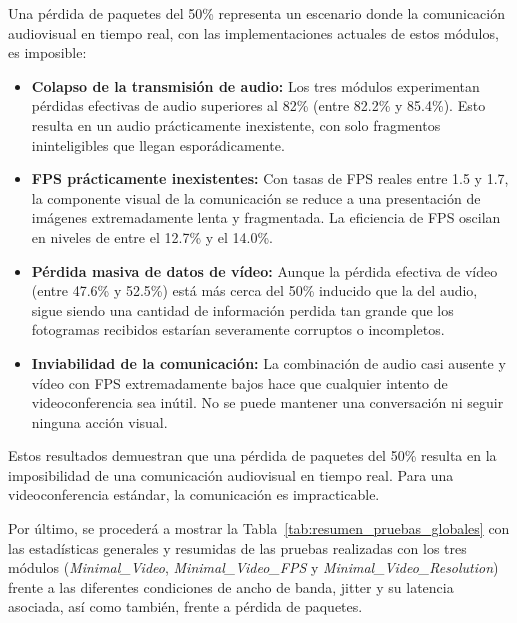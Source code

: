 Una pérdida de paquetes del 50\% representa un escenario donde la comunicación audiovisual en tiempo real, con las implementaciones actuales de estos módulos, es imposible:
\vspace{\baselineskip}

\begin{itemize}
\item \textbf{Colapso de la transmisión de audio:} Los tres módulos experimentan pérdidas efectivas de audio superiores al 82\% (entre 82.2\% y 85.4\%). Esto resulta en un audio prácticamente inexistente, con solo fragmentos ininteligibles que llegan esporádicamente.
\item \textbf{FPS prácticamente inexistentes:} Con tasas de FPS reales entre 1.5 y 1.7, la componente visual de la comunicación se reduce a una presentación de imágenes extremadamente lenta y fragmentada. La eficiencia de FPS oscilan en niveles de entre el 12.7\% y el 14.0\%.
\item \textbf{Pérdida masiva de datos de vídeo:} Aunque la pérdida efectiva de vídeo (entre 47.6\% y 52.5\%) está más cerca del 50\% inducido que la del audio, sigue siendo una cantidad de información perdida tan grande que los fotogramas recibidos estarían severamente corruptos o incompletos.
\item \textbf{Inviabilidad de la comunicación:} La combinación de audio casi ausente y vídeo con FPS extremadamente bajos hace que cualquier intento de videoconferencia sea inútil. No se puede mantener una conversación ni seguir ninguna acción visual.
\end{itemize}

Estos resultados demuestran que una pérdida de paquetes del 50\% resulta en la imposibilidad de una comunicación audiovisual en tiempo real. Para una videoconferencia estándar, la comunicación es impracticable.
\newpage

Por último, se procederá a mostrar la Tabla~\ref{tab:resumen_pruebas_globales} con las estadísticas generales y resumidas de las pruebas realizadas con los tres módulos (\textit{Minimal\_Video}, \textit{Minimal\_Video\_FPS} y \textit{Minimal\_Video\_Resolution}) frente a las diferentes condiciones de ancho de banda, jitter y su latencia asociada, así como también, frente a pérdida de paquetes.
\setlength{\tabcolsep}{3pt} 

